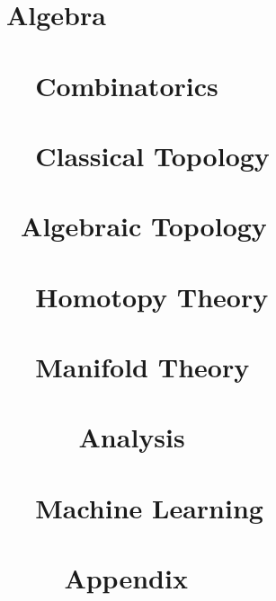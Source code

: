 

\part{Algebra}





\part{~~Combinatorics}



\part{~~Classical Topology}



\part{~Algebraic Topology}



\part{~~Homotopy Theory}



\part{~~Manifold Theory}



\part{~~~~~Analysis}



\part{~~Machine Learning}



\appendix

\part{~~~~Appendix}


% 

\printbibliography


